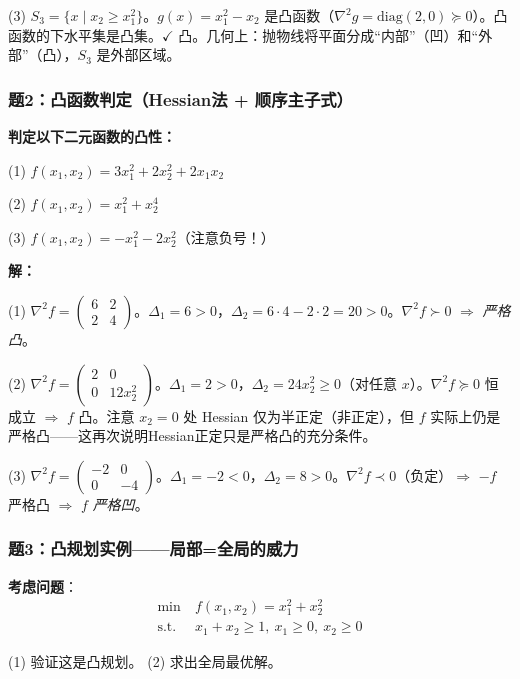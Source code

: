 (3) $S_3 = \{x \mid x_2 \ge x_1^2\}$。$g(x)=x_1^2-x_2$ 是凸函数（$\nabla^2 g=\text{diag}(2,0)\succeq0$）。凸函数的下水平集是凸集。$\checkmark$ 凸。几何上：抛物线将平面分成“内部”（凹）和“外部”（凸），$S_3$ 是外部区域。

\subsubsection{题2：凸函数判定（Hessian法 + 顺序主子式）}

\textbf{判定以下二元函数的凸性：}

(1) $f(x_1,x_2) = 3x_1^2 + 2x_2^2 + 2x_1x_2$

(2) $f(x_1,x_2) = x_1^2 + x_2^4$

(3) $f(x_1,x_2) = -x_1^2 - 2x_2^2$\quad（注意负号！）

\medskip
\textbf{解：}

(1) $\nabla^2 f = \begin{pmatrix}6&2\\2&4\end{pmatrix}$。$\Delta_1=6>0$，$\Delta_2=6\cdot4-2\cdot2=20>0$。$\nabla^2 f \succ 0$ $\Rightarrow$ \emph{严格凸}。

(2) $\nabla^2 f = \begin{pmatrix}2&0\\0&12x_2^2\end{pmatrix}$。$\Delta_1=2>0$，$\Delta_2=24x_2^2 \ge 0$（对任意 $x$）。$\nabla^2 f \succeq 0$ 恒成立 $\Rightarrow$ $f$ 凸。注意 $x_2=0$ 处 Hessian 仅为半正定（非正定），但 $f$ 实际上仍是严格凸——这再次说明Hessian正定只是严格凸的充分条件。

(3) $\nabla^2 f = \begin{pmatrix}-2&0\\0&-4\end{pmatrix}$。$\Delta_1=-2<0$，$\Delta_2=8>0$。$\nabla^2 f \prec 0$（负定）$\Rightarrow$ $-f$ 严格凸 $\Rightarrow$ $f$ \emph{严格凹}。

\subsubsection{题3：凸规划实例——局部=全局的威力}

\textbf{考虑问题}：
\[
\begin{aligned}
\min\ & f(x_1,x_2) = x_1^2 + x_2^2 \\
\text{s.t.}\ & x_1 + x_2 \ge 1,\ x_1 \ge 0,\ x_2 \ge 0
\end{aligned}
\]

(1) 验证这是凸规划。\quad
(2) 求出全局最优解。

